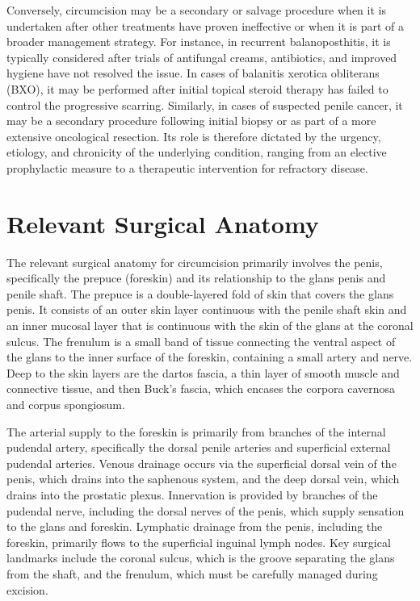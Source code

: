 Conversely, circumcision may be a secondary or salvage procedure when it is undertaken after other treatments have proven ineffective or when it is part of a broader management strategy. For instance, in recurrent balanoposthitis, it is typically considered after trials of antifungal creams, antibiotics, and improved hygiene have not resolved the issue. In cases of balanitis xerotica obliterans (BXO), it may be performed after initial topical steroid therapy has failed to control the progressive scarring. Similarly, in cases of suspected penile cancer, it may be a secondary procedure following initial biopsy or as part of a more extensive oncological resection. Its role is therefore dictated by the urgency, etiology, and chronicity of the underlying condition, ranging from an elective prophylactic measure to a therapeutic intervention for refractory disease.

\section*{Relevant Surgical Anatomy}
The relevant surgical anatomy for circumcision primarily involves the penis, specifically the prepuce (foreskin) and its relationship to the glans penis and penile shaft. The prepuce is a double-layered fold of skin that covers the glans penis. It consists of an outer skin layer continuous with the penile shaft skin and an inner mucosal layer that is continuous with the skin of the glans at the coronal sulcus. The frenulum is a small band of tissue connecting the ventral aspect of the glans to the inner surface of the foreskin, containing a small artery and nerve. Deep to the skin layers are the dartos fascia, a thin layer of smooth muscle and connective tissue, and then Buck's fascia, which encases the corpora cavernosa and corpus spongiosum.

The arterial supply to the foreskin is primarily from branches of the internal pudendal artery, specifically the dorsal penile arteries and superficial external pudendal arteries. Venous drainage occurs via the superficial dorsal vein of the penis, which drains into the saphenous system, and the deep dorsal vein, which drains into the prostatic plexus. Innervation is provided by branches of the pudendal nerve, including the dorsal nerves of the penis, which supply sensation to the glans and foreskin. Lymphatic drainage from the penis, including the foreskin, primarily flows to the superficial inguinal lymph nodes. Key surgical landmarks include the coronal sulcus, which is the groove separating the glans from the shaft, and the frenulum, which must be carefully managed during excision.

